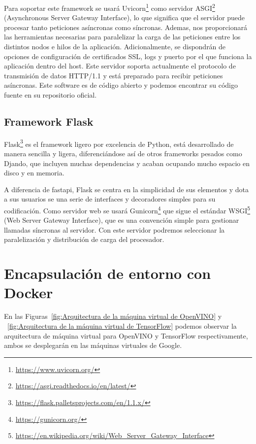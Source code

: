 Para soportar este framework se usará Uvicorn\footnote{\url{https://www.uvicorn.org/}} como servidor ASGI\footnote{\url{https://asgi.readthedocs.io/en/latest/}} (Asynchronous Server Gateway Interface), lo que significa que el servidor puede procesar tanto peticiones asíncronas como síncronas.
Ademas, nos proporcionará las herramientas necesarias para paralelizar la carga de las peticiones entre los distintos nodos e hilos de la aplicación.
Adicionalmente, se dispondrán de opciones de configuración de certificados SSL, logs y puerto por el que funciona la aplicación dentro del host.
Este servidor soporta actualmente el protocolo de transmisión de datos HTTP/1.1 y está preparado para recibir peticiones asíncronas.
Este software es de código abierto y podemos encontrar su código fuente en su repositorio oficial.

\subsection{Framework Flask}\label{subsec:framework-flask}
Flask\footnote{\url{https://flask.palletsprojects.com/en/1.1.x/}} es el framework ligero por excelencia de Python, está desarrollado de manera sencilla y ligera, diferenciándose así de otros frameworks pesados como Djando, que incluyen
muchas dependencias y acaban ocupando mucho espacio en disco y en memoria.

A diferencia de fastapi, Flask\cite{python_flask} se centra en la simplicidad de sus elementos y dota a sus usuarios se una serie de interfaces y decoradores simples para su codificación.
Como servidor web se usará Gunicorn\footnote{\url{https://gunicorn.org/}} que sigue el estándar WSGI\footnote{\url{https://en.wikipedia.org/wiki/Web\_Server\_Gateway\_Interface}} (Web Server Gateway Interface), que es una convención simple para gestionar llamadas síncronas al servidor.
Con este servidor podremos seleccionar la paralelización y distribución de carga del procesador.
\section{Encapsulación de entorno con Docker}\label{sec:encapsulación-de-entorno-con-docker}
En las Figuras~\ref{fig:Arquitectura de la máquina virtual de OpenVINO} y ~\ref{fig:Arquitectura de la máquina virtual de TensorFlow} podemos observar la arquitectura de máquina virtual para OpenVINO y TensorFlow respectivamente, ambos se desplegarán en las máquinas virtuales de Google.

